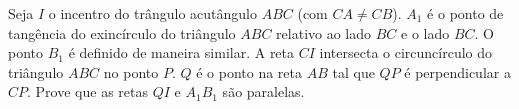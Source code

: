 Seja $I$ o incentro do trângulo acutângulo $ABC$ (com $CA \neq CB$). $A_1$ é o ponto de tangência do exincírculo do triângulo  $ABC$ relativo ao lado $BC$ e o lado $BC$. O ponto $B_1$ é definido de maneira similar. A reta $CI$ intersecta o circuncírculo do triângulo $ABC$ no ponto $P$. $Q$ é o ponto na reta $AB$ tal que $QP$ é perpendicular a $CP$. Prove que as retas $QI$ e $A_1B_1$ são paralelas.
